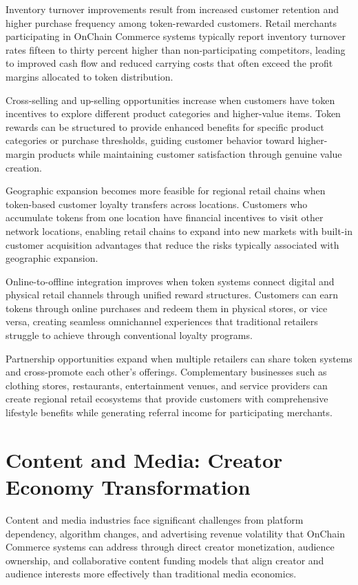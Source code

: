 \documentclass[
  Letterpaper,
]{scrbook}
\begin{document}
Inventory turnover improvements result from increased customer retention
and higher purchase frequency among token-rewarded customers. Retail
merchants participating in OnChain Commerce systems typically report
inventory turnover rates fifteen to thirty percent higher than
non-participating competitors, leading to improved cash flow and reduced
carrying costs that often exceed the profit margins allocated to token
distribution.

Cross-selling and up-selling opportunities increase when customers have
token incentives to explore different product categories and
higher-value items. Token rewards can be structured to provide enhanced
benefits for specific product categories or purchase thresholds, guiding
customer behavior toward higher-margin products while maintaining
customer satisfaction through genuine value creation.

Geographic expansion becomes more feasible for regional retail chains
when token-based customer loyalty transfers across locations. Customers
who accumulate tokens from one location have financial incentives to
visit other network locations, enabling retail chains to expand into new
markets with built-in customer acquisition advantages that reduce the
risks typically associated with geographic expansion.

Online-to-offline integration improves when token systems connect
digital and physical retail channels through unified reward structures.
Customers can earn tokens through online purchases and redeem them in
physical stores, or vice versa, creating seamless omnichannel
experiences that traditional retailers struggle to achieve through
conventional loyalty programs.

Partnership opportunities expand when multiple retailers can share token
systems and cross-promote each other's offerings. Complementary
businesses such as clothing stores, restaurants, entertainment venues,
and service providers can create regional retail ecosystems that provide
customers with comprehensive lifestyle benefits while generating
referral income for participating merchants.

\section{Content and Media: Creator Economy
Transformation}\label{content-and-media-creator-economy-transformation}

Content and media industries face significant challenges from platform
dependency, algorithm changes, and advertising revenue volatility that
OnChain Commerce systems can address through direct creator
monetization, audience ownership, and collaborative content funding
models that align creator and audience interests more effectively than
traditional media economics.
\end{document}
